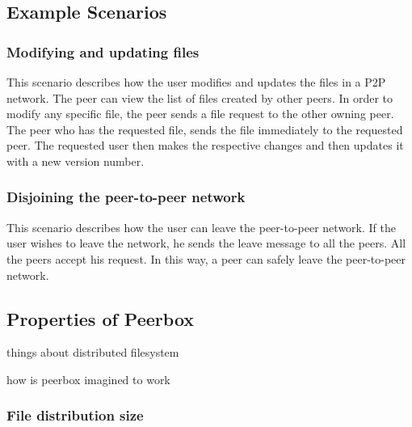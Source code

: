 
\subsection{Example Scenarios}


\subsubsection{Modifying and updating files}
This scenario describes how the user modifies and updates the files in a P2P network. The peer can view the list of files created by other peers. In order to modify any specific file, the peer sends a file request to the other owning peer. The peer who has the requested file, sends the file immediately to the requested peer. The requested user then makes the respective changes and then updates it with a new version number.  

\subsubsection{Disjoining the peer-to-peer network}
This scenario describes how the user can leave the peer-to-peer network. If the user wishes to leave the network, he sends the leave message to all the peers. All the peers accept his request. In this way, a peer can safely leave the peer-to-peer network.

\subsection{Properties of Peerbox}

things about distributed filesystem
 
how is peerbox imagined to work



\subsubsection{File distribution size}

